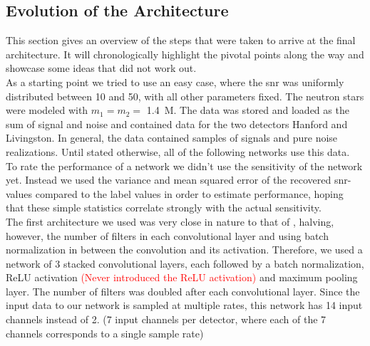 \subsection{Evolution of the Architecture}\label{sec:evolution_of_architecture}
This section gives an overview of the steps that were taken to arrive at the final architecture. It will chronologically highlight the pivotal points along the way and showcase some ideas that did not work out.\\
As a starting point we tried to use an easy case, where the \gls{snr} was uniformly distributed between 10 and 50, with all other parameters fixed. The neutron stars were modeled with $m_1=m_2=$ \SI{1.4}{M_\odot}. The data was stored and loaded as the sum of signal and noise and contained data for the two detectors Hanford and Livingston. In general, the data contained samples of signals and pure noise realizations. Until stated otherwise, all of the following networks use this data.\\
To rate the performance of a network we didn't use the sensitivity of the network yet. Instead we used the variance and mean squared error of the recovered \gls{snr}-values compared to the label values in order to estimate performance, hoping that these simple statistics correlate strongly with the actual sensitivity.\medskip\\
The first architecture we used was very close in nature to that of \cite{huerta_parameter_estimation}, halving, however, the number of filters in each convolutional layer and using batch normalization in between the convolution and its activation. Therefore, we used a network of 3 stacked convolutional layers, each followed by a batch normalization, ReLU activation \textcolor{red}{(Never introduced the ReLU activation)} and maximum pooling layer. The number of filters was doubled after each convolutional layer. Since the input data to our network is sampled at multiple rates, this network has 14 input channels instead of 2. (7 input channels per detector, where each of the 7 channels corresponds to a single sample rate)\\
